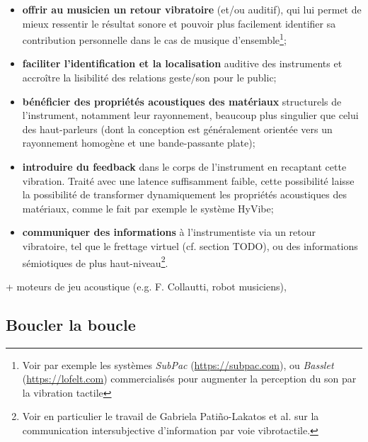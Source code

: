 \begin{itemize}[noitemsep]
	\item \textbf{offrir au musicien un retour vibratoire} (et/ou auditif), qui lui permet de mieux ressentir le résultat sonore et pouvoir plus facilement identifier sa contribution personnelle dans le cas de musique d'ensemble\footnote{Voir par exemple les systèmes \textit{SubPac} (\url{https://subpac.com}), ou \textit{Basslet} (\url{https://lofelt.com}) commercialisés pour augmenter la perception du son par la vibration tactile};
	\item \textbf{faciliter l'identification et la localisation} auditive des instruments et accroître la lisibilité des relations geste/son pour le public;
	\item \textbf{bénéficier des propriétés acoustiques des matériaux} structurels de l'instrument, notamment leur rayonnement, beaucoup plus singulier que celui des haut-parleurs (dont la conception est généralement orientée vers un rayonnement homogène et une bande-passante plate);
	\item \textbf{introduire du feedback} dans le corps de l'instrument en recaptant cette vibration. Traité avec une latence suffisamment faible, cette possibilité laisse la possibilité de transformer dynamiquement les propriétés acoustiques des matériaux, comme le fait par exemple le système HyVibe;
	\item \textbf{communiquer des informations} à l'instrumentiste via un retour vibratoire, tel que le frettage virtuel (cf. section TODO), ou des informations sémiotiques de plus haut-niveau\footnote{Voir en particulier le travail de Gabriela Patiño-Lakatos et al. \cite{patino-lakatos_paradigmes_2019} sur la communication intersubjective d'information par voie vibrotactile.}.
\end{itemize}


+ moteurs de jeu acoustique (e.g. F. Collautti, robot musiciens), 

\subsection{Boucler la boucle}

